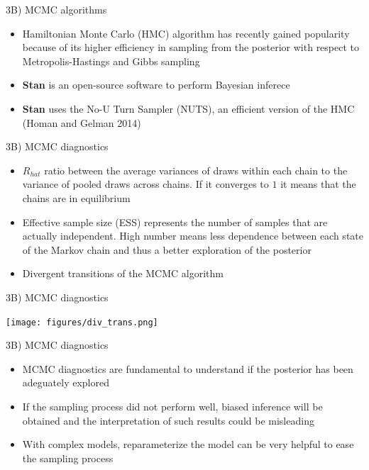 \documentclass[ignorenonframetext,a4paper]{beamer}
\begin{document}
\begin{frame}{3B) MCMC algorithms}

\begin{itemize}
\item
  Hamiltonian Monte Carlo (HMC) algorithm has recently gained popularity
  because of its higher efficiency in sampling from the posterior with
  respect to Metropolis-Hastings and Gibbs sampling
\item
  \textbf{Stan} is an open-source software to perform Bayesian inferece
\item
  \textbf{Stan} uses the No-U Turn Sampler (NUTS), an efficient version
  of the HMC (Homan and Gelman 2014)
\end{itemize}

\end{frame}

\begin{frame}{3B) MCMC diagnostics}

\begin{itemize}
\setlength\itemsep{1em}
  \item{$R_{hat}$ ratio between the average variances of draws 
        within each chain to the variance of pooled draws across
        chains. If it converges to $1$ it means that the chains are
        in equilibrium}
  \item{Effective sample size (ESS) represents the number of samples
        that are actually independent. High number means less dependence
        between each state of the Markov chain and thus a better
        exploration of the posterior}
  \item{Divergent transitions of the MCMC algorithm}
\end{itemize}

\end{frame}

\begin{frame}{3B) MCMC diagnostics}

\texttt{[image: figures/div\_trans.png]}

\end{frame}

\begin{frame}{3B) MCMC diagnostics}

\begin{itemize}
\setlength\itemsep{1em}
  \item{MCMC diagnostics are fundamental to understand if the
        posterior has been adeguately explored}
  \item{If the sampling process did not perform well, biased inference
        will be obtained and the interpretation of such results
        could be misleading}
  \item{With complex models, reparameterize the model can be very
        helpful to ease the sampling process}
\end{itemize}

\end{frame}
\end{document}
